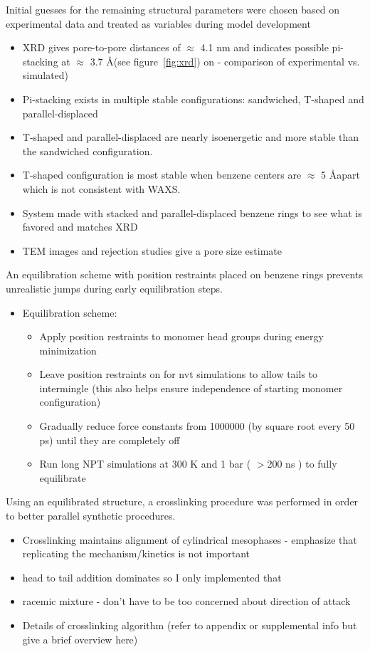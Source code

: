 \documentclass{article}
\newcommand{\angstrom}{\textup{\AA}}
\begin{document}
	\noindent Initial guesses for the remaining structural parameters were chosen based on experimental data and treated as variables during model development 
	\begin{itemize}
		\item XRD gives pore-to-pore distances of $\approx$ 4.1 nm and indicates possible pi-stacking at $\approx$ 3.7 \angstrom (see figure~\ref{fig:xrd}) on - comparison of experimental vs. simulated)
		\item Pi-stacking exists in multiple stable configurations: sandwiched, T-shaped and parallel-displaced
		\item T-shaped and parallel-displaced are nearly isoenergetic and more stable than the sandwiched configuration.
		\item T-shaped configuration is most stable when benzene centers are $\approx$ 5 \angstrom apart which is not consistent with WAXS. %
		\item System made with stacked and parallel-displaced benzene rings to see what is favored and matches XRD
		\item TEM images and rejection studies give a pore size estimate
	\end{itemize}

	An equilibration scheme with position restraints placed on benzene rings prevents unrealistic jumps during early equilibration steps.
	\begin{itemize}
		\item Equilibration scheme:
		\begin{itemize}
			\item Apply position restraints to monomer head groups during energy minimization 
			\item Leave position restraints on for nvt simulations to allow tails to intermingle (this also helps ensure independence of starting monomer configuration)
			\item Gradually reduce force constants from 1000000 (by square root every 50 ps) until they are completely off
			\item Run long NPT simulations at 300 K and 1 bar ( $>$200 ns ) to fully equilibrate 
		\end{itemize}
	\end{itemize}
	
	Using an equilibrated structure, a crosslinking procedure was performed in order to better parallel synthetic procedures. 
	\begin{itemize}
		\item Crosslinking maintains alignment of cylindrical mesophases - emphasize that replicating the mechanism/kinetics is not important 
		\item head to tail addition dominates so I only implemented that
		\item racemic mixture - don't have to be too concerned about direction of attack 
		\item Details of crosslinking algorithm (refer to appendix or supplemental info but give a brief overview here)
	\end{itemize}  
	
\end{document}
